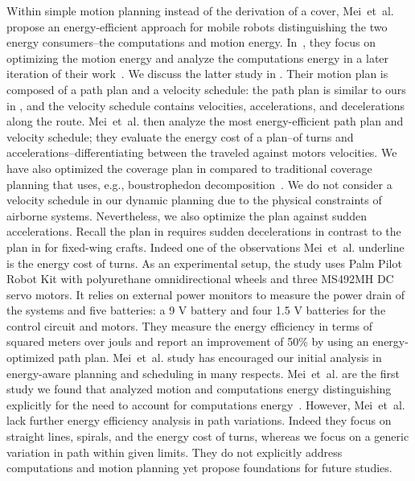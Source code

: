 Within simple motion planning instead of the derivation of a cover, Mei~et~al. propose an energy-efficient approach for mobile robots distinguishing the two energy consumers--the computations and motion energy. In~\citep{mei2004energy}, they focus on optimizing the motion energy and analyze the computations energy in a later iteration of their work~\citep{mei2005case}. We discuss the latter study in . Their motion plan is composed of a path plan and a velocity schedule: the path plan is similar to ours in , and the velocity schedule contains velocities, accelerations, and decelerations along the route. Mei~et~al. then analyze the most energy-efficient path plan and velocity schedule; they evaluate the energy cost of a plan--of turns and accelerations--differentiating between the traveled against motors velocities. We have also optimized the coverage plan in  compared to traditional coverage planning that uses, e.g., boustrophedon decomposition~\citep{lavalle2006planning}. We do not consider a velocity schedule in our dynamic planning due to the physical constraints of airborne systems. Nevertheless, we also optimize the plan against sudden accelerations. Recall the plan in  requires sudden decelerations in contrast to the plan in  for fixed-wing crafts. Indeed one of the observations Mei~et~al. underline is the energy cost of turns. As an experimental setup, the study uses Palm Pilot Robot Kit with polyurethane omnidirectional wheels and three MS492MH DC servo motors. It relies on external power monitors to measure the power drain of the systems and five batteries: a 9 V battery and four 1.5 V batteries for the control circuit and motors. They measure the energy efficiency in terms of squared meters over jouls and report an improvement of 50\% by using an energy-optimized path plan. Mei~et~al. study has encouraged our initial analysis in energy-aware planning and scheduling in many respects. Mei~et~al. are the first study we found that analyzed motion and computations energy distinguishing explicitly for the need to account for computations energy~\citep{mei2005case}. However, Mei~et~al. lack further energy efficiency analysis in path variations. Indeed they focus on straight lines, spirals, and the energy cost of turns, whereas we focus on a generic variation in path within given limits. They do not explicitly address computations and motion planning yet propose foundations for future studies.

